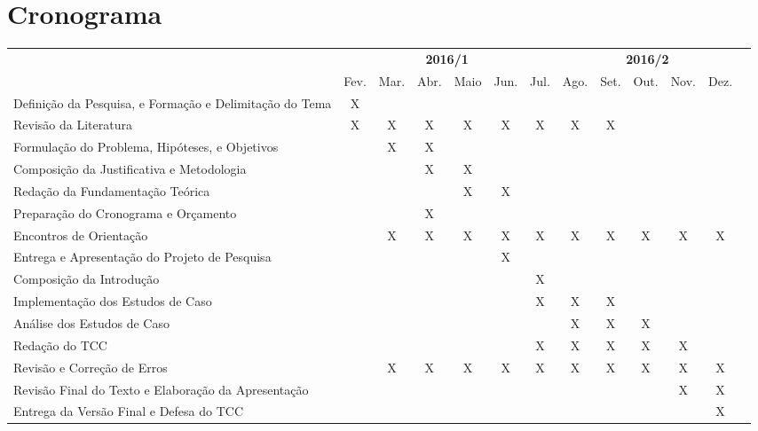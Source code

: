 \section{Cronograma}\label{lcronograma}

\begin{adjustbox}{center}
  \tiny
  \begin{tabular}{|p{4cm}|c|c|c|c|c|c|c|c|c|c|c|l|}
    \cline{1-12}
      \multicolumn{1}{|c|}{
        \multirow{2}{*}{
          \diagbox[width=4.4cm]{
            \textbf{Atividades}
          }{
            \textbf{Ano/Mês}
          }}}
      & \multicolumn{6}{c|}{\textbf{2016/1}}
      & \multicolumn{5}{c|}{\textbf{2016/2}} \\
      \cline{2-12}
      & Fev. & Mar. & Abr. & Maio & Jun. & Jul. & Ago. & Set. & Out. & Nov. & Dez. \\
    \hline
      Definição da Pesquisa, e Formação e Delimitação do Tema
      & X &  &  &  &  &  &  &  &  &  &  \\
    \hline
      Revisão da Literatura
      & X & X & X & X & X & X & X & X &  &  &  \\
    \hline
      Formulação do Problema, Hipóteses, e Objetivos
      & & X & X & &  &  &  &  &  &  &  \\
    \hline
      Composição da Justificativa e Metodologia
      & & & X & X & & & & & & & \\
    \hline
      Redação da Fundamentação Teórica
      & & & & X & X & & & & & & \\
    \hline
      Preparação do Cronograma e Orçamento
      & & & X & & & & & & & & \\
    \hline
      Encontros de Orientação
      & & X & X & X & X & X & X & X & X & X & X \\
    \hline
      Entrega e Apresentação do Projeto de Pesquisa
      & & & & & X & & & & & & \\
    \hline
      Composição da Introdução
      & & & & & & X & & & & & \\
    \hline
      Implementação dos Estudos de Caso
      & & & & & & X & X & X & & & \\
    \hline
      Análise dos Estudos de Caso
      & & & & & & & X & X & X & & \\
    \hline
      Redação do TCC
      & & & & & & X & X & X & X & X & \\
    \hline
      Revisão e Correção de Erros
      & & X & X & X & X & X & X & X & X & X & X \\
    \hline
      Revisão Final do Texto e Elaboração da Apresentação
      & & & & & & & & & & X & X \\
    \hline
      Entrega da Versão Final e Defesa do TCC
      & & & & & & & & & & & X \\
    \hline
  \end{tabular}
\end{adjustbox}

